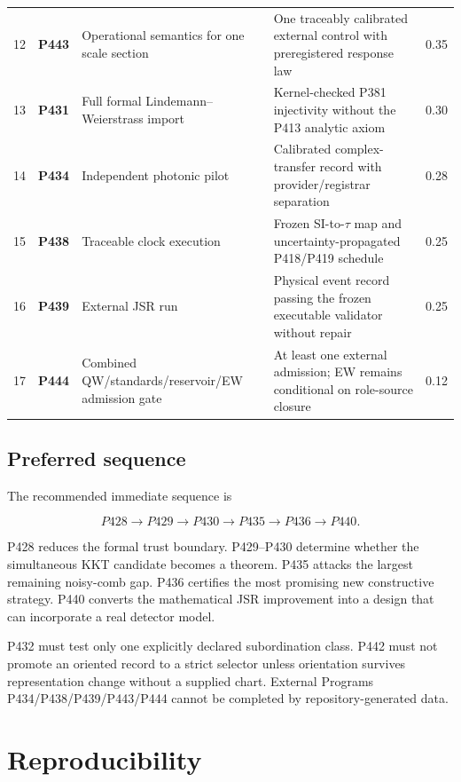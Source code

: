 \documentclass[11pt,a4paper,openany]{report}
\begin{document}
\begin{center}
\begin{longtable}{@{}p{}p{}p{}p{}p{}@{}}
12 & \textbf{P443} & Operational semantics for one scale section & One traceably calibrated external control with preregistered response law & 0.35 \\
13 & \textbf{P431} & Full formal Lindemann--Weierstrass import & Kernel-checked P381 injectivity without the P413 analytic axiom & 0.30 \\
14 & \textbf{P434} & Independent photonic pilot & Calibrated complex-transfer record with provider/\allowbreak{}registrar separation & 0.28 \\
15 & \textbf{P438} & Traceable clock execution & Frozen SI-to-\(\tau\) map and uncertainty-propagated P418/\allowbreak{}P419 schedule & 0.25 \\
16 & \textbf{P439} & External JSR run & Physical event record passing the frozen executable validator without repair & 0.25 \\
17 & \textbf{P444} & Combined QW/\allowbreak{}standards/\allowbreak{}reservoir/\allowbreak{}EW admission gate & At least one external admission; EW remains conditional on role-source closure & 0.12 \\
\bottomrule
\end{longtable}
\endgroup
\end{center}

\section{Preferred sequence}

The recommended immediate sequence is

\[
\boxed{
P428\to P429\to P430\to P435\to P436\to P440.
}
\]

P428 reduces the formal trust boundary. P429--P430 determine whether the simultaneous KKT candidate becomes a theorem. P435 attacks the largest remaining noisy-comb gap. P436 certifies the most promising new constructive strategy. P440 converts the mathematical JSR improvement into a design that can incorporate a real detector model.

P432 must test only one explicitly declared subordination class. P442 must not promote an oriented record to a strict selector unless orientation survives representation change without a supplied chart. External Programs P434/\allowbreak{}P438/\allowbreak{}P439/\allowbreak{}P443/\allowbreak{}P444 cannot be completed by repository-generated data.

\chapter{Reproducibility}
\end{document}
